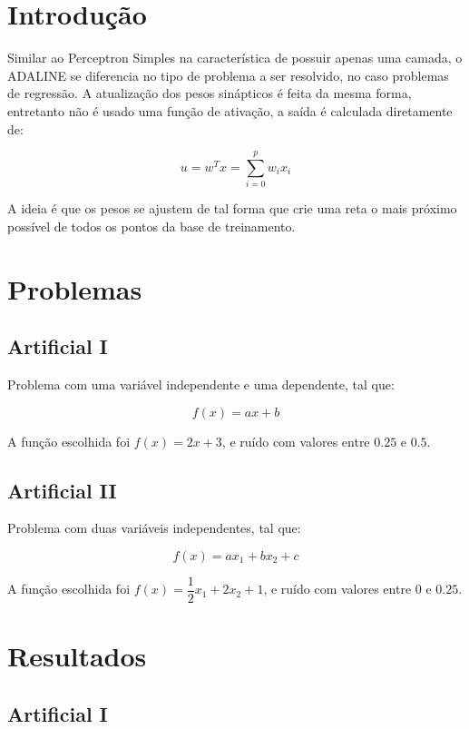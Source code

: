 \section{Introdução}\label{introduuxe7uxe3o}

Similar ao Perceptron Simples na característica de possuir apenas uma
camada, o ADALINE se diferencia no tipo de problema a ser resolvido, no
caso problemas de regressão. A atualização dos pesos sinápticos é feita
da mesma forma, entretanto não é usado uma função de ativação, a saída é
calculada diretamente de:

\[
u = w^T x = \sum^p_{i = 0} w_i x_i
\]

A ideia é que os pesos se ajustem de tal forma que crie uma reta o mais
próximo possível de todos os pontos da base de treinamento.

\section{Problemas}\label{problemas}

\subsection{Artificial I}\label{artificial-i}

Problema com uma variável independente e uma dependente, tal que:

\[f(x) = ax + b\]

A função escolhida foi \(f(x) = 2x + 3\), e ruído com valores entre
\(0.25\) e \(0.5\).

\subsection{Artificial II}\label{artificial-ii}

Problema com duas variáveis independentes, tal que:

\[
f(x) = ax_1 + bx_2 + c
\]

A função escolhida foi \(f(x) = \dfrac{1}{2}x_1 + 2x_2 + 1\), e ruído
com valores entre \(0\) e \(0.25\).

\section{Resultados}\label{resultados}

\subsection{Artificial I}\label{artificial-i-1}

